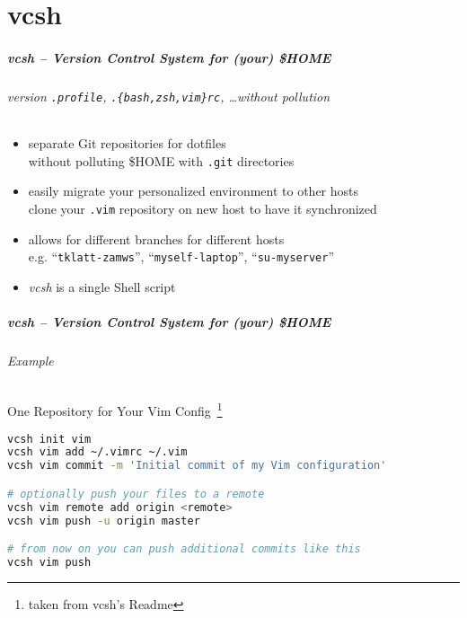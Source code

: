 \documentclass[english,hyperref={pdfpagelabels=false},aspectratio=169]{beamer}
\begin{document}
\part{vcsh}
\makepart

\begin{frame}[label=vcsh]
  \frametitle{vcsh -- Version Control System for (your) \$HOME}
  \framesubtitle{version \texttt{.profile}, \texttt{.\{bash,zsh,vim\}rc}, \dots without pollution}
  \begin{itemize}
    \item separate Git repositories for dotfiles\\
      {\scriptsize without polluting \$HOME with \texttt{.git} directories}
    \item easily migrate your personalized environment to other hosts\\
      {\scriptsize clone your \texttt{.vim} repository on new host to have it synchronized}
    \item allows for different branches for different hosts\\
      {\scriptsize e.g. ``\texttt{tklatt-zamws}'', ``\texttt{myself-laptop}'', ``\texttt{su-myserver}''}
    \item \textit{vcsh} is a single Shell script
  \end{itemize}
\end{frame}

\begin{frame}[fragile]
  \frametitle{vcsh -- Version Control System for (your) \$HOME}
  \framesubtitle{Example}
  \begin{block}{One Repository for Your Vim Config~\footnote{\tiny taken from vcsh's Readme}}
    \vspace{-0.75em}
    \begin{lstlisting}[language=sh,basicstyle=\scriptsize\ttfamily,commentstyle=\normalfont\ttfamily\color{fzjgray50}]
vcsh init vim
vcsh vim add ~/.vimrc ~/.vim
vcsh vim commit -m 'Initial commit of my Vim configuration'

# optionally push your files to a remote
vcsh vim remote add origin <remote>
vcsh vim push -u origin master

# from now on you can push additional commits like this
vcsh vim push
    \end{lstlisting}
    \vspace{-0.75em}
  \end{block}
\end{frame}
\end{document}
